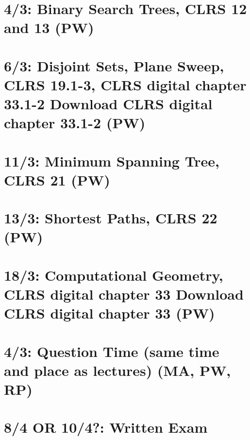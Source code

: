 \documentclass[a4paper]{article}
\begin{document}
\section{4/3: Binary Search Trees, CLRS 12 and 13 (PW)}
\section{6/3: Disjoint Sets, Plane Sweep, CLRS 19.1-3, CLRS digital chapter 33.1-2
  Download CLRS digital chapter 33.1-2 (PW)}
\section{11/3: Minimum Spanning Tree, CLRS 21 (PW)}
\section{13/3: Shortest Paths, CLRS 22 (PW)}
\section{18/3: Computational Geometry, CLRS digital chapter 33
  Download CLRS digital chapter 33 (PW)}
\section{4/3: Question Time (same time and place as lectures) (MA, PW, RP)}
\section{8/4 OR 10/4?: Written Exam}



\end{document}
